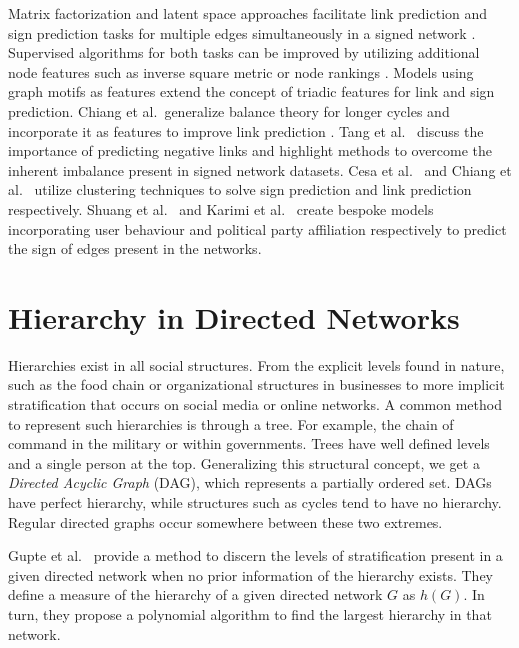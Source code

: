 Matrix factorization and latent space approaches facilitate link prediction and sign prediction tasks for multiple edges simultaneously in a signed network \cite{agrawal2013link,hsieh2012low,gu2019link}.
Supervised algorithms for both tasks can be improved by utilizing additional node features such as inverse square metric \cite{ahmadalinezhad2018sign} or node rankings \cite{shahriari2014ranking}.
Models using graph motifs as features \cite{Liu2019LinkPrediction,khodadadi2017sign} extend the concept of triadic features for link and sign prediction.
Chiang et al.\ generalize balance theory for longer cycles and incorporate it as features to improve link prediction \cite{chiang2011exploiting}.
Tang et al.\ \cite{Jiliang2015Negative} discuss the importance of predicting negative links and highlight methods to overcome the inherent imbalance present in signed network datasets.
Cesa et al.\ \cite{cesa2012correlation} and Chiang et al.\ \cite{chiang2014prediction} utilize clustering techniques to solve sign prediction and link prediction respectively.
Shuang et al.\ \cite{Shuang-Hong2012Friend} and Karimi et al.\ \cite{karimi2019multicongress} create bespoke models incorporating user behaviour and political party affiliation respectively to predict the sign of edges present in the networks.

\section{Hierarchy in Directed Networks}
\label{sec:hierarchy}
Hierarchies exist in all social structures.
From the explicit levels found in nature, such as the food chain or organizational structures in businesses to more implicit stratification that occurs on social media or online networks.
A common method to represent such hierarchies is through a tree.
For example, the chain of command in the military or within governments.
Trees have well defined levels and a single person at the top.
Generalizing this structural concept, we get a \textit{Directed Acyclic Graph} (DAG), which represents a partially ordered set.
DAGs have perfect hierarchy, while structures such as cycles tend to have no hierarchy.
Regular directed graphs occur somewhere between these two extremes.

Gupte et al.\ \cite{gupte2011finding} provide a method to discern the levels of stratification present in a given directed network when no prior information of the hierarchy exists.
They define a measure of the hierarchy of a given directed network $G$ as $h(G)$.
In turn, they propose a polynomial algorithm to find the largest hierarchy in that network.


